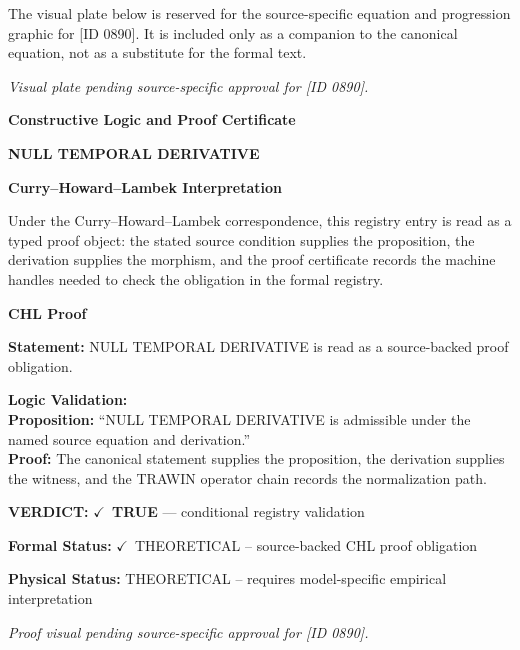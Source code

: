 \begingroup\footnotesize\sloppy
The visual plate below is reserved for the source-specific equation and progression graphic for [ID 0890]. It is included only as a companion to the canonical equation, not as a substitute for the formal text.
\par\endgroup
\begingroup\footnotesize\itshape
Visual plate pending source-specific approval for [ID 0890].
\par\endgroup

\clearpage
\begingroup\tzpsupportsetup
\noindent\textbf{\fontsize{10.8pt}{12.8pt}\selectfont [ID 0890] Constructive Logic and Proof Certificate}\par
\noindent\textbf{\fontsize{10pt}{12pt}\selectfont NULL TEMPORAL DERIVATIVE}\par
\vspace{0.45em}
\begingroup
\footnotesize
\setlength{\parskip}{0.22em}
\setlength{\parindent}{0pt}
\noindent\textbf{Curry--Howard--Lambek Interpretation}\par
Under the Curry--Howard--Lambek correspondence, this registry entry is read as a typed proof
object: the stated source condition supplies the proposition, the derivation supplies the
morphism, and the proof certificate records the machine handles needed to check the obligation
in the formal registry.

\vspace{0.45em}
\noindent\textbf{CHL Proof}\par
\textbf{Statement:} NULL TEMPORAL DERIVATIVE is read as a source-backed proof obligation.

\textbf{Logic Validation:}\\
\textbf{Proposition:} ``NULL TEMPORAL DERIVATIVE is admissible under the named source equation and derivation.''\\
\textbf{Proof:} The canonical statement supplies the proposition, the derivation supplies the witness, and the TRAWIN operator chain records the normalization path.

\textbf{VERDICT:} \ensuremath{\checkmark}\ \textbf{TRUE} --- conditional registry validation

\textbf{Formal Status:} \ensuremath{\checkmark}\ THEORETICAL -- source-backed CHL proof obligation

\textbf{Physical Status:} THEORETICAL -- requires model-specific empirical interpretation
\par\vspace{0.45em}
\par
\vfill
\begingroup\footnotesize\itshape
Proof visual pending source-specific approval for [ID 0890].
\par\endgroup
\vfill
\endgroup
\endgroup
